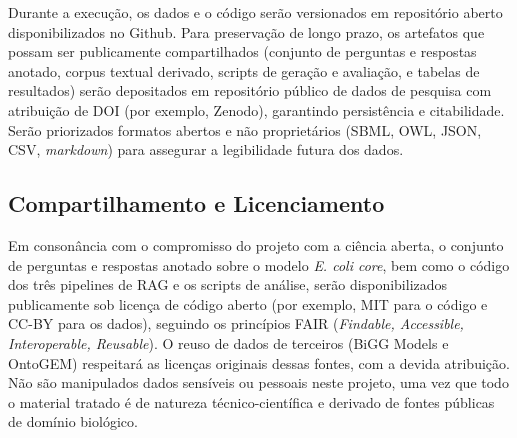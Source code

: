\documentclass{article}
\begin{document}
	Durante a execução, os dados e o código serão versionados em repositório aberto disponibilizados no Github. Para preservação de longo prazo, os artefatos que possam ser publicamente compartilhados (conjunto de perguntas e respostas anotado, corpus textual derivado, scripts de geração e avaliação, e tabelas de resultados) serão depositados em repositório público de dados de pesquisa com atribuição de DOI (por exemplo, Zenodo), garantindo persistência e citabilidade. Serão priorizados formatos abertos e não proprietários (SBML, OWL, JSON, CSV, \textit{markdown}) para assegurar a legibilidade futura dos dados. %
	
	\subsection{Compartilhamento e Licenciamento} %
	
	Em consonância com o compromisso do projeto com a ciência aberta, o conjunto de perguntas e respostas anotado sobre o modelo \textit{E. coli core}, bem como o código dos três pipelines de RAG e os scripts de análise, serão disponibilizados publicamente sob licença de código aberto (por exemplo, MIT para o código e CC-BY para os dados), seguindo os princípios FAIR (\textit{Findable, Accessible, Interoperable, Reusable}). O reuso de dados de terceiros (BiGG Models e OntoGEM) respeitará as licenças originais dessas fontes, com a devida atribuição. Não são manipulados dados sensíveis ou pessoais neste projeto, uma vez que todo o material tratado é de natureza técnico-científica e derivado de fontes públicas de domínio biológico. %
	
	
	
	
	
\end{document}
